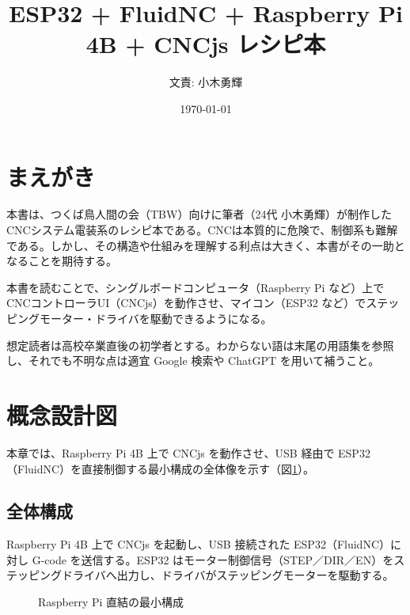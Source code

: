 \documentclass[uplatex,dvipdfmx]{ujarticle}
\begin{document}
\title{ESP32 + FluidNC + Raspberry Pi 4B + CNCjs レシピ本}
\author{文責: 小木勇輝}
\date{\today}
\maketitle

\tableofcontents
\newpage

\section{まえがき}

本書は、つくば鳥人間の会（TBW）向けに筆者（24代 小木勇輝）が制作したCNCシステム電装系のレシピ本である。CNCは本質的に危険で、制御系も難解である。しかし、その構造や仕組みを理解する利点は大きく、本書がその一助となることを期待する。

本書を読むことで、シングルボードコンピュータ（Raspberry Pi など）上でCNCコントローラUI（CNCjs）を動作させ、マイコン（ESP32 など）でステッピングモーター・ドライバを駆動できるようになる。

想定読者は高校卒業直後の初学者とする。わからない語は末尾の用語集を参照し、それでも不明な点は適宜 Google 検索や ChatGPT を用いて補うこと。

\section{概念設計図}

本章では、Raspberry Pi 4B 上で CNCjs を動作させ、USB 経由で ESP32（FluidNC）を直接制御する最小構成の全体像を示す（図\ref{fig:minimal}）。

\subsection{全体構成}

Raspberry Pi 4B 上で CNCjs を起動し、USB 接続された ESP32（FluidNC）に対し G-code を送信する。ESP32 はモーター制御信号（STEP／DIR／EN）をステッピングドライバへ出力し、ドライバがステッピングモーターを駆動する。

\begin{figure}[h]
\centering
{}
\caption{Raspberry Pi 直結の最小構成}
\label{fig:minimal}
\end{figure}
\end{document}
